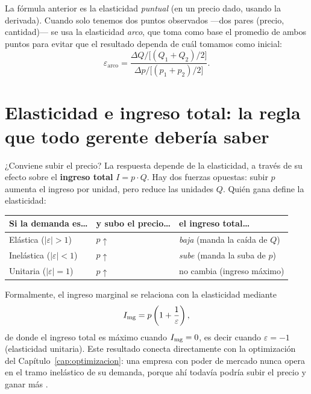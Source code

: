 La fórmula anterior es la elasticidad \emph{puntual} (en un precio dado, usando la derivada). Cuando solo tenemos dos puntos observados —dos pares (precio, cantidad)— se usa la elasticidad \emph{arco}, que toma como base el promedio de ambos puntos para evitar que el resultado dependa de cuál tomamos como inicial:
\begin{equation}
\varepsilon_{\text{arco}} = \frac{\Delta Q/\big[(Q_1+Q_2)/2\big]}{\Delta p/\big[(p_1+p_2)/2\big]}.
\end{equation}

\section{Elasticidad e ingreso total: la regla que todo gerente debería saber}

¿Conviene subir el precio? La respuesta depende de la elasticidad, a través de su efecto sobre el \textbf{ingreso total} $I = p\cdot Q$. Hay dos fuerzas opuestas: subir $p$ aumenta el ingreso por unidad, pero reduce las unidades $Q$. Quién gana define la elasticidad:

\begin{center}
\begin{tabular}{lll}
\toprule
\textbf{Si la demanda es\ldots} & \textbf{y subo el precio\ldots} & \textbf{el ingreso total\ldots} \\
\midrule
Elástica ($|\varepsilon|>1$)    & $p\uparrow$ & \emph{baja} (manda la caída de $Q$) \\
Inelástica ($|\varepsilon|<1$)  & $p\uparrow$ & \emph{sube} (manda la suba de $p$) \\
Unitaria ($|\varepsilon|=1$)    & $p\uparrow$ & no cambia (ingreso máximo) \\
\bottomrule
\end{tabular}
\end{center}

Formalmente, el ingreso marginal se relaciona con la elasticidad mediante
\begin{equation}
I_{\mathrm{mg}} = p\left(1 + \frac{1}{\varepsilon}\right),
\label{eq:img_elasticidad}
\end{equation}
de donde el ingreso total es máximo cuando $I_{\mathrm{mg}}=0$, es decir cuando $\varepsilon=-1$ (elasticidad unitaria). Este resultado conecta directamente con la optimización del Capítulo~\ref{cap:optimizacion}: una empresa con poder de mercado nunca opera en el tramo inelástico de su demanda, porque ahí todavía podría subir el precio y ganar más \cite{pindyck}.

